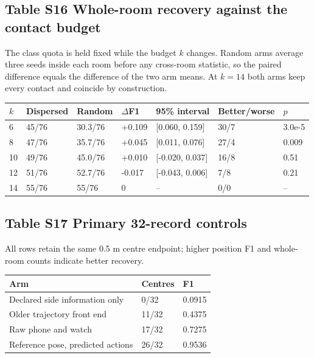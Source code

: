 \documentclass[10pt,letterpaper]{article}
\begin{document}
\begin{minipage}{\linewidth}\subsection*{Table S16 Whole-room recovery against the contact budget}
The class quota is held fixed while the budget $k$ changes. Random arms average
three seeds inside each room before any cross-room statistic, so the paired
difference equals the difference of the two arm means. At $k=14$ both arms
keep every contact and coincide by construction.

\begin{center}\small\begin{tabular}{@{}p{}p{}p{}p{}p{}p{}p{}@{}}\toprule
\textbf{$k$} & \textbf{Dispersed} & \textbf{Random} & \textbf{$\Delta$F1} & \textbf{95\% interval} & \textbf{Better/worse} & \textbf{$p$} \\ \midrule
6 & 45/76 & 30.3/76 & +0.109 & {[}0.060, 0.159{]} & 30/7 & 3.0e-5 \\
8 & 47/76 & 35.7/76 & +0.045 & {[}0.011, 0.076{]} & 27/4 & 0.009 \\
10 & 49/76 & 45.0/76 & +0.010 & {[}-0.020, 0.037{]} & 16/8 & 0.51 \\
12 & 51/76 & 52.7/76 & -0.017 & {[}-0.043, 0.006{]} & 7/8 & 0.21 \\
14 & 55/76 & 55/76 & 0 & -- & 0/0 & -- \\
\end{tabular}\end{center}
\end{minipage}


\begin{minipage}{\linewidth}\subsection*{Table S17 Primary 32-record controls}
All rows retain the same 0.5 m centre endpoint; higher position F1 and
whole-room counts indicate better recovery.

\begin{center}\small\begin{tabular}{@{}p{}p{}p{}@{}}\toprule
\textbf{Arm} & \textbf{Centres} & \textbf{F1} \\ \midrule
Declared side information only & 0/32 & 0.0915 \\
Older trajectory front end & 11/32 & 0.4375 \\
Raw phone and watch & 17/32 & 0.7275 \\
Reference pose, predicted actions & 26/32 & 0.9536 \\
\end{tabular}\end{center}
\end{minipage}
\end{document}
